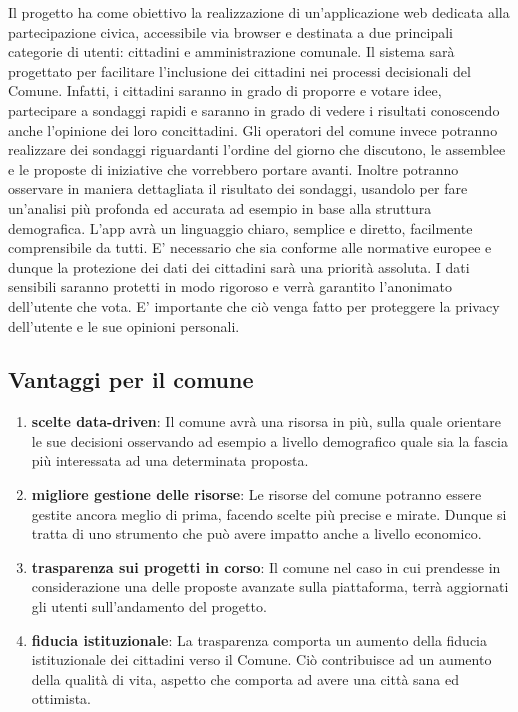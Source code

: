 \documentclass{article}
\begin{document}
Il progetto ha come obiettivo la realizzazione di un'applicazione web dedicata alla partecipazione civica, accessibile via browser e destinata a due principali categorie di utenti: cittadini e amministrazione comunale.  Il sistema sarà progettato per facilitare l’inclusione dei cittadini nei processi decisionali del Comune. Infatti, i cittadini saranno in grado di proporre e votare idee, partecipare a sondaggi rapidi e saranno in grado di vedere i risultati conoscendo anche l’opinione dei loro concittadini.
Gli operatori del comune invece potranno realizzare dei sondaggi riguardanti l'ordine del giorno che discutono, le assemblee e le proposte di iniziative che vorrebbero portare avanti. Inoltre potranno osservare in maniera dettagliata il risultato dei sondaggi, usandolo per fare un'analisi più profonda ed accurata ad esempio in base alla struttura demografica.
L'app avrà un linguaggio chiaro, semplice e diretto, facilmente comprensibile da tutti. E' necessario che sia conforme alle normative europee e dunque la protezione dei dati dei cittadini sarà una priorità assoluta. I dati sensibili saranno protetti in modo rigoroso e verrà garantito l’anonimato dell’utente che vota. E’ importante che ciò venga fatto per proteggere la privacy dell’utente e le sue opinioni personali.

\subsection{Vantaggi per il comune}
\begin{enumerate}
      \item \textbf{scelte data-driven}: Il comune avrà una risorsa in più, sulla quale orientare le sue decisioni osservando ad esempio a livello demografico quale sia la fascia più interessata ad una determinata proposta.
      \item \textbf{migliore gestione delle risorse}: Le risorse del comune potranno essere gestite ancora meglio di prima, facendo scelte più precise e mirate. Dunque si tratta di uno strumento che può avere impatto anche a livello economico.
      \item \textbf{trasparenza sui progetti in corso}: Il comune nel caso in cui prendesse in considerazione una delle proposte avanzate sulla piattaforma, terrà aggiornati gli utenti sull’andamento del progetto.
      \item \textbf{fiducia istituzionale}: La trasparenza comporta un aumento della fiducia istituzionale dei cittadini verso il Comune. Ciò contribuisce ad un aumento della qualità di vita, aspetto che comporta ad avere una città sana ed ottimista.
\end{enumerate}
\end{document}
